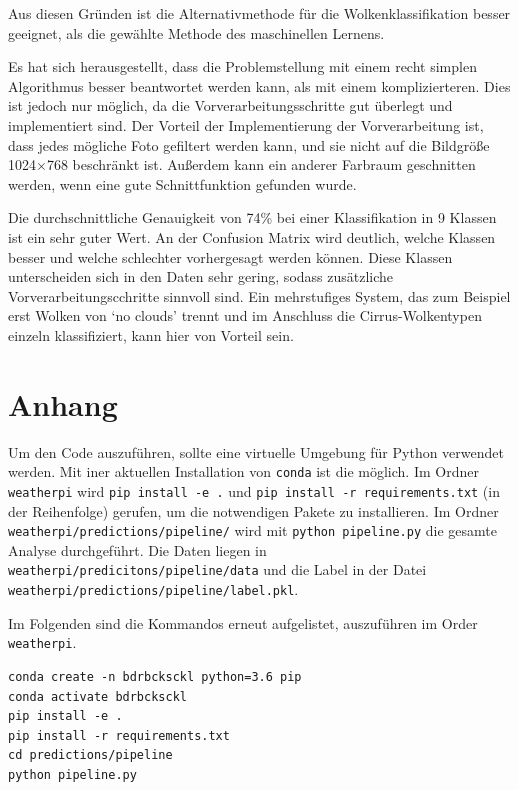 Aus diesen Gründen ist die Alternativmethode für die
Wolkenklassifikation besser geeignet, als die gewählte Methode des
maschinellen Lernens.

Es hat sich herausgestellt, dass die Problemstellung mit einem recht
simplen Algorithmus besser beantwortet werden kann, als mit einem
komplizierteren. Dies ist jedoch nur möglich, da die
Vorverarbeitungsschritte gut überlegt und implementiert sind. Der
Vorteil der Implementierung der Vorverarbeitung ist, dass jedes mögliche
Foto gefiltert werden kann, und sie nicht auf die Bildgröße 1024$\times$768
beschränkt ist. Außerdem kann ein anderer Farbraum geschnitten werden,
wenn eine gute Schnittfunktion gefunden wurde.

Die durchschnittliche Genauigkeit von 74\% bei einer Klassifikation in 9 Klassen
ist ein sehr guter Wert.
An der Confusion Matrix wird deutlich, welche Klassen besser und welche schlechter vorhergesagt
werden können.
Diese Klassen unterscheiden sich in den Daten sehr gering,
sodass zusätzliche Vorverarbeitungscchritte sinnvoll sind.
Ein mehrstufiges System,
das zum Beispiel erst Wolken von `no clouds' trennt
und im Anschluss die Cirrus-Wolkentypen einzeln klassifiziert,
kann hier von Vorteil sein.

\newpage

\hypertarget{anhang}{%
\section*{Anhang}\label{anhang}}

Um den Code auszuführen, sollte eine virtuelle Umgebung für Python
verwendet werden. Mit iner aktuellen Installation von \texttt{conda} ist
die möglich. Im Ordner \texttt{weatherpi} wird
\texttt{pip\ install\ -e\ .} und
\texttt{pip\ install\ -r\ requirements.txt} (in der Reihenfolge)
gerufen, um die notwendigen Pakete zu installieren. Im Ordner
\texttt{weatherpi/predictions/pipeline/} wird mit
\texttt{python\ pipeline.py} die gesamte Analyse durchgeführt. Die Daten
liegen in \texttt{weatherpi/predicitons/pipeline/data} und die Label in
der Datei \linebreak\texttt{weatherpi/predictions/pipeline/label.pkl}.

Im Folgenden sind die Kommandos erneut aufgelistet, auszuführen im Order
\texttt{weatherpi}.

\begin{verbatim}
conda create -n bdrbcksckl python=3.6 pip
conda activate bdrbcksckl
pip install -e .
pip install -r requirements.txt
cd predictions/pipeline
python pipeline.py
\end{verbatim}

